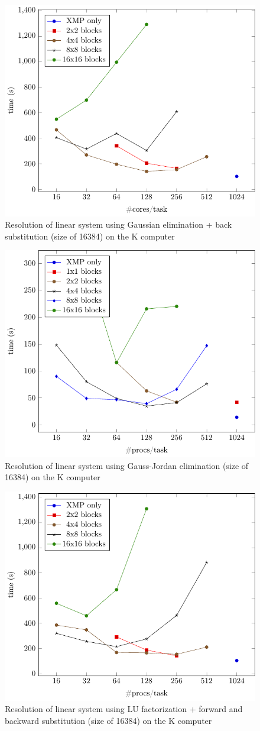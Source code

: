 \begin{figure}[h]
	\caption{Resolution of linear system using Gaussian elimination + back substitution (size of 16384) on the K computer\label{fig:K_g}}
	\centering
	\includegraphics[width=.6\textwidth]{figK-g-16k.pdf}
\end{figure}

\begin{figure}[h]
	\caption{Resolution of linear system using Gauss-Jordan elimination (size of 16384) on the K computer\label{fig:K_gj}}
	\centering
	\includegraphics[width=.6\textwidth]{figK-gj-16k.pdf}
\end{figure}

\begin{figure}[h]
	\caption{Resolution of linear system using LU factorization + forward and backward substitution (size of 16384) on the K computer\label{fig:K_lu}}
	\centering
	\includegraphics[width=.6\textwidth]{figK-lu-16k.pdf}
\end{figure}

